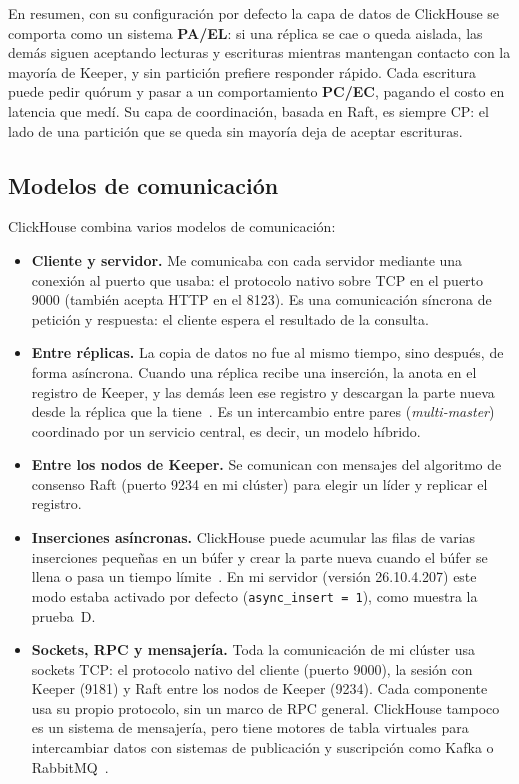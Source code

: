 \documentclass[12pt,a4paper]{article}
\begin{document}
En resumen, con su configuración por defecto la capa de datos de
ClickHouse se comporta como un sistema \textbf{PA/EL}: si una réplica se
cae o queda aislada, las demás siguen aceptando lecturas y escrituras
mientras mantengan contacto con la mayoría de Keeper, y sin partición
prefiere responder rápido. Cada escritura puede pedir quórum y pasar a un
comportamiento \textbf{PC/EC}, pagando el costo en latencia que medí. Su
capa de coordinación, basada en Raft, es siempre CP: el lado de una
partición que se queda sin mayoría deja de aceptar escrituras.

\subsection{Modelos de comunicación}

ClickHouse combina varios modelos de comunicación:

\begin{itemize}
  \item \textbf{Cliente y servidor.} Me comunicaba con cada servidor
    mediante una conexión al puerto que usaba: el protocolo nativo sobre
    TCP en el puerto 9000 (también acepta HTTP en el 8123). Es una
    comunicación síncrona de petición y respuesta: el cliente espera el
    resultado de la consulta.
  \item \textbf{Entre réplicas.} La copia de datos no fue al mismo tiempo,
    sino después, de forma asíncrona. Cuando una réplica recibe una
    inserción, la anota en el registro de Keeper, y las demás leen ese
    registro y descargan la parte nueva desde la réplica que la
    tiene~\cite[p.~3736]{schulze2024}. Es un intercambio entre pares
    (\emph{multi-master}) coordinado por un servicio central, es decir,
    un modelo híbrido.
  \item \textbf{Entre los nodos de Keeper.} Se comunican con mensajes del
    algoritmo de consenso Raft (puerto 9234 en mi clúster) para elegir un
    líder y replicar el registro.
  \item \textbf{Inserciones asíncronas.} ClickHouse puede acumular las
    filas de varias inserciones pequeñas en un búfer y crear la parte
    nueva cuando el búfer se llena o pasa un tiempo
    límite~\cite[p.~3733]{schulze2024}. En mi servidor (versión
    26.10.4.207) este modo estaba activado por defecto
    (\texttt{async\_insert = 1}), como muestra la prueba~D.
  \item \textbf{Sockets, RPC y mensajería.} Toda la comunicación de mi
    clúster usa sockets TCP: el protocolo nativo del cliente (puerto 9000),
    la sesión con Keeper (9181) y Raft entre los nodos de Keeper (9234).
    Cada componente usa su propio protocolo, sin un marco de RPC general.
    ClickHouse tampoco es un sistema de mensajería, pero tiene motores de
    tabla virtuales para intercambiar datos con sistemas de publicación y
    suscripción como Kafka o RabbitMQ~\cite[p.~3732]{schulze2024}.
\end{itemize}
\end{document}
